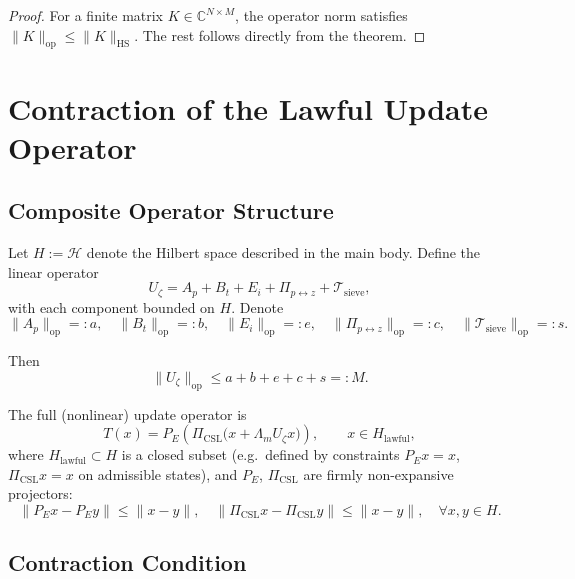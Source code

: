 \documentclass[11pt]{article}
\begin{document}
\begin{proof}
For a finite matrix $K\in\mathbb{C}^{N\times M}$, the operator norm satisfies $\|K\|_{\mathrm{op}}\le \|K\|_{\mathrm{HS}}$. The rest follows directly from the theorem.
\end{proof}

\section{Contraction of the Lawful Update Operator}

\subsection{Composite Operator Structure}

Let $H:=\mathcal{H}$ denote the Hilbert space described in the main body. Define the linear operator
\begin{equation}
  U_\zeta
   = A_p + B_t + E_i + \Pi_{p\leftrightarrow z} + \mathcal{T}_{\mathrm{sieve}},
\end{equation}
with each component bounded on $H$. Denote
\[
\|A_p\|_{\mathrm{op}} =: a,\quad
\|B_t\|_{\mathrm{op}} =: b,\quad
\|E_i\|_{\mathrm{op}} =: e,\quad
\|\Pi_{p\leftrightarrow z}\|_{\mathrm{op}} =: c,\quad
\|\mathcal{T}_{\mathrm{sieve}}\|_{\mathrm{op}} =: s.
\]

Then
\begin{equation}
  \|U_\zeta\|_{\mathrm{op}}
    \le a + b + e + c + s
    =: M.
  \label{eq:U-zeta-bound}
\end{equation}

The full (nonlinear) update operator is
\begin{equation}
  T(x)
    = P_E\left(
        \Pi_{\mathrm{CSL}}\bigl(x + \Lambda_m U_\zeta x\bigr)
      \right),
  \qquad x\in H_{\mathrm{lawful}},
  \label{eq:T-def}
\end{equation}
where $H_{\mathrm{lawful}}\subset H$ is a closed subset (e.g.\ defined by constraints $P_E x = x$, $\Pi_{\mathrm{CSL}} x = x$ on admissible states), and $P_E$, $\Pi_{\mathrm{CSL}}$ are firmly non-expansive projectors:
\begin{equation}
  \|P_E x - P_E y\|
    \le \|x - y\|,
  \quad
  \|\Pi_{\mathrm{CSL}} x - \Pi_{\mathrm{CSL}} y\|
    \le \|x - y\|,
  \quad\forall x,y\in H.
\end{equation}

\subsection{Contraction Condition}
\end{document}
